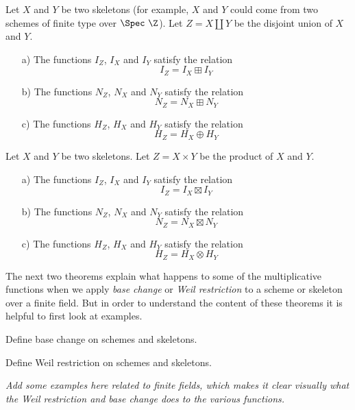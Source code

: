 \documentclass[a4paper]{article}
\begin{document}
\begin{theorem}
Let $X$ and $Y$ be two skeletons (for example, $X$ and $Y$ could come from two schemes of finite type over $\Spec \ \Z$). Let $Z = X \coprod Y$ be the disjoint union of $X$ and $Y$.
\begin{itemize}
\item[a)] The functions $I_Z$, $I_X$ and $I_Y$ satisfy the relation
$$  I_Z = I_X \boxplus I_Y   $$
\item[b)] The functions $N_Z$, $N_X$ and $N_Y$ satisfy the relation
$$  N_Z = N_X \boxplus N_Y   $$
\item[c)] The functions $H_Z$, $H_X$ and $H_Y$ satisfy the relation
$$  H_Z = H_X \oplus H_Y   $$

\end{itemize}
\end{theorem}


\begin{theorem}
Let $X$ and $Y$ be two skeletons. Let $Z = X \times Y$ be the product of $X$ and $Y$.
\begin{itemize}
\item[a)] The functions $I_Z$, $I_X$ and $I_Y$ satisfy the relation
$$  I_Z = I_X \boxtimes I_Y   $$
\item[b)] The functions $N_Z$, $N_X$ and $N_Y$ satisfy the relation
$$  N_Z = N_X \boxtimes N_Y   $$
\item[c)] The functions $H_Z$, $H_X$ and $H_Y$ satisfy the relation
$$  H_Z = H_X \otimes H_Y   $$

\end{itemize}
\end{theorem}

The next two theorems explain what happens to some of the multiplicative functions when we apply \emph{base change} or \emph{Weil restriction} to a scheme or skeleton over a finite field. But in order to understand the content of these theorems it is helpful to first look at examples.

\begin{definition}
Define base change on schemes and skeletons.
\end{definition}


\begin{definition}
Define Weil restriction on schemes and skeletons.
\end{definition}

\emph{Add some examples here related to finite fields, which makes it clear visually what the Weil restriction and base change does to the various functions.}
\end{document}

